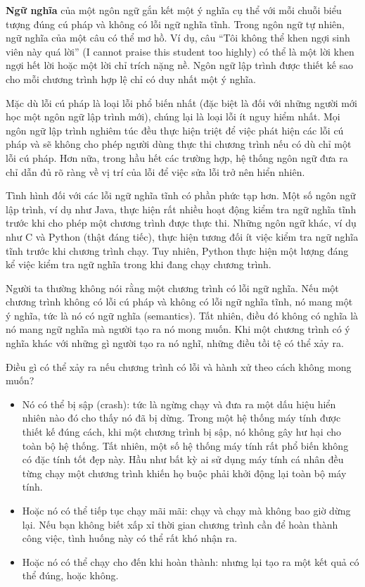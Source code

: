 \textbf{Ngữ nghĩa} của một ngôn ngữ gắn kết một ý nghĩa cụ thể với mỗi chuỗi biểu tượng đúng cú pháp và không có lỗi ngữ nghĩa tĩnh. Trong ngôn ngữ tự nhiên, ngữ nghĩa của một câu có thể mơ hồ. Ví dụ, câu ``Tôi không thể khen ngợi sinh viên này quá lời'' (I cannot praise this student too highly) có thể là một lời khen ngợi hết lời hoặc một lời chỉ trích nặng nề. Ngôn ngữ lập trình được thiết kế sao cho mỗi chương trình hợp lệ chỉ có duy nhất một ý nghĩa.

Mặc dù lỗi cú pháp là loại lỗi phổ biến nhất (đặc biệt là đối với những người mới học một ngôn ngữ lập trình mới), chúng lại là loại lỗi ít nguy hiểm nhất. Mọi ngôn ngữ lập trình nghiêm túc đều thực hiện triệt để việc phát hiện các lỗi cú pháp và sẽ không cho phép người dùng thực thi chương trình nếu có dù chỉ một lỗi cú pháp. Hơn nữa, trong hầu hết các trường hợp, hệ thống ngôn ngữ đưa ra chỉ dẫn đủ rõ ràng về vị trí của lỗi để việc sửa lỗi trở nên hiển nhiên.

Tình hình đối với các lỗi ngữ nghĩa tĩnh có phần phức tạp hơn. Một số ngôn ngữ lập trình, ví dụ như Java, thực hiện rất nhiều hoạt động kiểm tra ngữ nghĩa tĩnh trước khi cho phép một chương trình được thực thi. Những ngôn ngữ khác, ví dụ như C và Python (thật đáng tiếc), thực hiện tương đối ít việc kiểm tra ngữ nghĩa tĩnh trước khi chương trình chạy. Tuy nhiên, Python thực hiện một lượng đáng kể việc kiểm tra ngữ nghĩa trong khi đang chạy chương trình.

Người ta thường không nói rằng một chương trình có lỗi ngữ nghĩa. Nếu một chương trình không có lỗi cú pháp và không có lỗi ngữ nghĩa tĩnh, nó mang một ý nghĩa, tức là nó có ngữ nghĩa (semantics). Tất nhiên, điều đó không có nghĩa là nó mang ngữ nghĩa mà người tạo ra nó mong muốn. Khi một chương trình có ý nghĩa khác với những gì người tạo ra nó nghĩ, những điều tồi tệ có thể xảy ra.

Điều gì có thể xảy ra nếu chương trình có lỗi và hành xử theo cách không mong muốn?

\begin{itemize}
    \item Nó có thể bị sập (crash): tức là ngừng chạy và đưa ra một dấu hiệu hiển nhiên nào đó cho thấy nó đã bị dừng. Trong một hệ thống máy tính được thiết kế đúng cách, khi một chương trình bị sập, nó không gây hư hại cho toàn bộ hệ thống. Tất nhiên, một số hệ thống máy tính rất phổ biến không có đặc tính tốt đẹp này. Hầu như bất kỳ ai sử dụng máy tính cá nhân đều từng chạy một chương trình khiến họ buộc phải khởi động lại toàn bộ máy tính.
    
    \item Hoặc nó có thể tiếp tục chạy mãi mãi: chạy và chạy mà không bao giờ dừng lại. Nếu bạn không biết xấp xỉ thời gian chương trình cần để hoàn thành công việc, tình huống này có thể rất khó nhận ra.
    
    \item Hoặc nó có thể chạy cho đến khi hoàn thành: nhưng lại tạo ra một kết quả có thể đúng, hoặc không.
\end{itemize}

